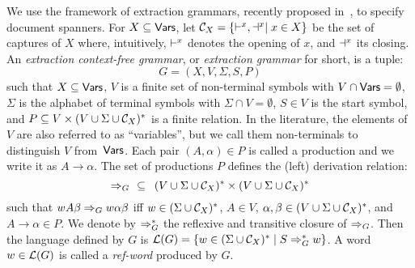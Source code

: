 We use the framework of extraction grammars, recently proposed in~\cite{liatpaper}, to specify document spanners. 
For $X \subseteq \mathsf{Vars}$, let $\mathcal{C}_{X} = \{\vdash^{x}, \dashv^{x}\mid x\in X\}$ be the set of captures of $X$ where, intuitively, $\vdash^{x}$ denotes the opening of $x$, and $\dashv^{x}$ its closing. 
An \emph{extraction context-free grammar}, or \emph{extraction grammar} for short, is a tuple:
\[
G = (X, V, \Sigma, S, P)
\] 
such that $X \subseteq \mathsf{Vars}$, $V$ is a finite set of non-terminal symbols with $V\cap \mathsf{Vars} = \emptyset$, $\Sigma$ is the alphabet of terminal symbols with $\Sigma \cap V = \emptyset$, $S \in V$ is the start symbol, and $P \subseteq V \times (V \cup \Sigma \cup \mathcal{C}_{X})^*$ is a finite relation. In the literature, the elements of $V$ are also referred to as ``variables'', but we call them non-terminals to distinguish $V$ from~$\mathsf{Vars}$.
Each pair $(A, \alpha) \in P$ is called a production and we write it as $A \rightarrow \alpha$. The set of productions $P$ defines the (left) derivation relation:
\[
\Rightarrow_{G} \ \ \subseteq \ \, (V \cup \Sigma \cup \mathcal{C}_{X})^* \times (V \cup \Sigma \cup \mathcal{C}_{X})^*
\] 
such that $w A \beta \Rightarrow_{G} w \alpha \beta$ iff $w \in (\Sigma \cup \mathcal{C}_{X})^*$, $A \in V$, $\alpha, \beta \in (V \cup \Sigma \cup \mathcal{C}_{X})^*$, and $A \rightarrow \alpha \in P$. We denote by $\Rightarrow_{G}^*$ the reflexive and transitive closure of $\Rightarrow_{G}$. Then the language defined by $G$ is $\mathcal{L}(G) = \{w \in (\Sigma \cup \mathcal{C}_{X})^* \mid S \Rightarrow_{G}^* w\}$. 
A word $w \in \mathcal{L}(G)$ is called a \emph{ref-word} produced by $G$. 

